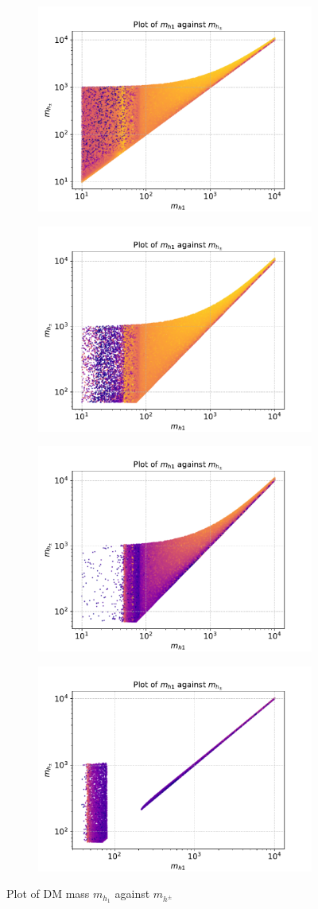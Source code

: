 \documentclass[12pt]{article}
\begin{document}
\begin{figure}[H]
    \begin{subfigure}{\textwidth}
      \centering
      \includegraphics[width=0.5\columnwidth]{plots/MD1_MDP_cut1.pdf}
    \end{subfigure}%
    \begin{subfigure}{\textwidth}
      \centering
      \includegraphics[width=0.5\columnwidth]{plots/MD1_MDP_cut1cut2.pdf}
    \end{subfigure}
    \begin{subfigure}{\textwidth}
      \centering
      \includegraphics[width=0.5\columnwidth]{plots/MD1_MDP_cut1cut2cut3.pdf}
    \end{subfigure}
    \begin{subfigure}{\textwidth}
      \centering
      \includegraphics[width=0.5\columnwidth]{plots/MD1_MDP_cut1cut2cut3cut4.pdf}
    \end{subfigure}
    \caption{Plot of DM mass $m_{h_1}$ against $m_{h^\pm}$}
    \label{fig:input noise}
    \end{figure}
\newpage
\twocolumn
\end{document}
